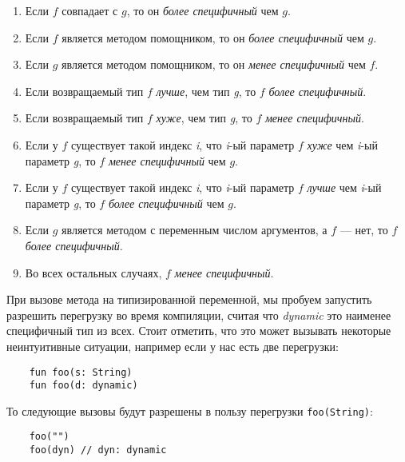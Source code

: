\begin{enumerate}
    \item Если $f$ совпадает с $g$, то он \textit{более специфичный} чем $g$.
    \item Если $f$ является методом помощником, то он \textit{более специфичный} чем $g$.
    \item Если $g$ является методом помощником, то он \textit{менее специфичный} чем $f$.
    \item Если возвращаемый тип $f$ \textit{лучше}, чем тип \textit{g}, то $f$ \textit{более специфичный}.
    \item Если возвращаемый тип $f$ \textit{хуже}, чем тип \textit{g}, то $f$ \textit{менее специфичный}.
    \item Если у $f$ существует такой индекс \textit{i}, что \textit{i}-ый параметр $f$ \textit{хуже} чем \textit{i}-ый параметр \textit{g}, то $f$ \textit{менее специфичный} чем $g$.
    \item Если у $f$ существует такой индекс \textit{i}, что \textit{i}-ый параметр $f$ \textit{лучше} чем \textit{i}-ый параметр \textit{g}, то $f$ \textit{более специфичный} чем $g$.
    \item Если $g$ является методом с переменным числом аргументов, а $f$ --- нет, то $f$ \textit{более специфичный}.
    \item Во всех остальных случаях, $f$ \textit{менее специфичный}.
\end{enumerate}

При вызове метода на типизированной переменной, мы пробуем запустить разрешить перегрузку во время компиляции, считая что \textit{dynamic} это наименее специфичный тип из всех. Стоит отметить, что это может вызывать некоторые неинтуитивные ситуации, например если у нас есть две перегрузки:

\begin{verbatim}
    fun foo(s: String)
    fun foo(d: dynamic)
\end{verbatim} 

То следующие вызовы будут разрешены в пользу перегрузки \texttt{foo(String)}:

\begin{verbatim}
    foo("")
    foo(dyn) // dyn: dynamic
\end{verbatim} 


